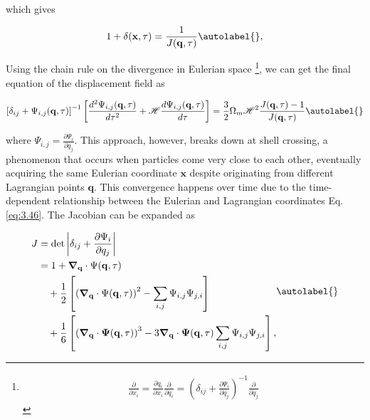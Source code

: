 which gives


\begin{equation}
1+\delta(\mathbf{x}, \tau)=\frac{1}{J(\mathbf{q}, \tau)} \autolabel{},
\end{equation}


Using the chain rule on the divergence in Eulerian space \footnote{
\begin{align*}
    \frac{\partial}{\partial x_{i}}=\frac{\partial q_{i}}{\partial x_{i}} \frac{\partial}{\partial q_{i}}=\left(\delta_{i j}+\frac{\partial \Psi_{i}}{\partial q_{j}}\right)^{-1} \frac{\partial}{\partial q_{j}}
\end{align*}
}, 
we can get the final equation of the displacement field as


\begin{equation}
    \left[\delta_{i j}+\Psi_{i, j}(\mathbf{q}, \tau)\right]^{-1}\left[\frac{d^{2} \Psi_{i, j}(\mathbf{q}, \tau)}{d \tau^{2}}+\mathcal{H} \frac{d \Psi_{i, j}(\mathbf{q}, \tau)}{d \tau}\right]=\frac{3}{2} \Omega_{m} \mathcal{H}^{2} \frac{J(\mathbf{q}, \tau)-1}{J(\mathbf{q}, \tau)} \autolabel{}
\end{equation}


 where $\Psi_{i,j} = \frac{\partial \Psi_{i}}{\partial q_{j}}$. This approach, however, breaks down at shell crossing, a phenomenon that occurs when particles come very close to each other, eventually acquiring the same Eulerian coordinate $\mathbf{x}$ despite originating from different Lagrangian points $\mathbf{q}$. This convergence happens over time due to the time-dependent relationship between the Eulerian and Lagrangian coordinates Eq. \eqref{eq:3.46}. The Jacobian can be expanded as

\begin{equation}
\begin{aligned}
    J &= \operatorname{det}\left|\delta_{ij} + \frac{\partial \Psi_{i}}{\partial q_{j}}\right| \\
    &= 1 + \boldsymbol{\nabla}_{\mathbf{q}} \cdot \Psi(\mathbf{q}, \tau) \\
    &\quad + \frac{1}{2}\left[\left(\boldsymbol{\nabla}_{\mathbf{q}} \cdot \Psi(\mathbf{q}, \tau)\right)^{2} - \sum_{i,j} \Psi_{i,j} \Psi_{j,i}\right] \\
    &\quad + \frac{1}{6}\left[\left(\boldsymbol{\nabla}_{\mathbf{q}} \cdot \boldsymbol{\Psi}(\mathbf{q}, \tau)\right)^{3} - 3 \boldsymbol{\nabla}_{\mathbf{q}} \cdot \boldsymbol{\Psi}(\mathbf{q}, \tau) \sum_{i,j} \Psi_{i,j} \Psi_{j,i}\right],
\end{aligned}
\autolabel{}
\end{equation}

